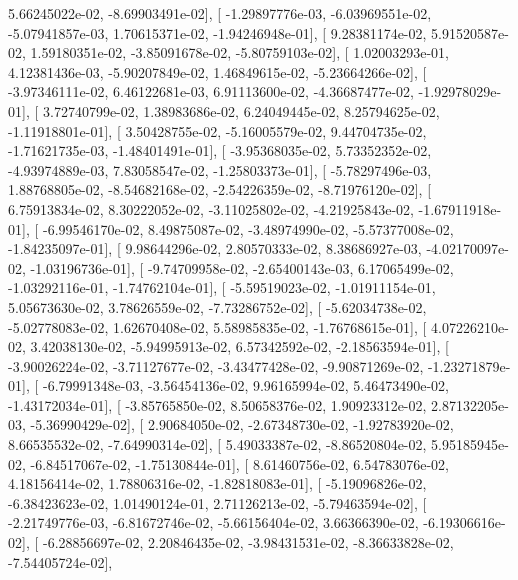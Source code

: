\documentclass{article}
\begin{document}
          5.66245022e-02,  -8.69903491e-02],
       [ -1.29897776e-03,  -6.03969551e-02,  -5.07941857e-03,
          1.70615371e-02,  -1.94246948e-01],
       [  9.28381174e-02,   5.91520587e-02,   1.59180351e-02,
         -3.85091678e-02,  -5.80759103e-02],
       [  1.02003293e-01,   4.12381436e-03,  -5.90207849e-02,
          1.46849615e-02,  -5.23664266e-02],
       [ -3.97346111e-02,   6.46122681e-03,   6.91113600e-02,
         -4.36687477e-02,  -1.92978029e-01],
       [  3.72740799e-02,   1.38983686e-02,   6.24049445e-02,
          8.25794625e-02,  -1.11918801e-01],
       [  3.50428755e-02,  -5.16005579e-02,   9.44704735e-02,
         -1.71621735e-03,  -1.48401491e-01],
       [ -3.95368035e-02,   5.73352352e-02,  -4.93974889e-03,
          7.83058547e-02,  -1.25803373e-01],
       [ -5.78297496e-03,   1.88768805e-02,  -8.54682168e-02,
         -2.54226359e-02,  -8.71976120e-02],
       [  6.75913834e-02,   8.30222052e-02,  -3.11025802e-02,
         -4.21925843e-02,  -1.67911918e-01],
       [ -6.99546170e-02,   8.49875087e-02,  -3.48974990e-02,
         -5.57377008e-02,  -1.84235097e-01],
       [  9.98644296e-02,   2.80570333e-02,   8.38686927e-03,
         -4.02170097e-02,  -1.03196736e-01],
       [ -9.74709958e-02,  -2.65400143e-03,   6.17065499e-02,
         -1.03292116e-01,  -1.74762104e-01],
       [ -5.59519023e-02,  -1.01911154e-01,   5.05673630e-02,
          3.78626559e-02,  -7.73286752e-02],
       [ -5.62034738e-02,  -5.02778083e-02,   1.62670408e-02,
          5.58985835e-02,  -1.76768615e-01],
       [  4.07226210e-02,   3.42038130e-02,  -5.94995913e-02,
          6.57342592e-02,  -2.18563594e-01],
       [ -3.90026224e-02,  -3.71127677e-02,  -3.43477428e-02,
         -9.90871269e-02,  -1.23271879e-01],
       [ -6.79991348e-03,  -3.56454136e-02,   9.96165994e-02,
          5.46473490e-02,  -1.43172034e-01],
       [ -3.85765850e-02,   8.50658376e-02,   1.90923312e-02,
          2.87132205e-03,  -5.36990429e-02],
       [  2.90684050e-02,  -2.67348730e-02,  -1.92783920e-02,
          8.66535532e-02,  -7.64990314e-02],
       [  5.49033387e-02,  -8.86520804e-02,   5.95185945e-02,
         -6.84517067e-02,  -1.75130844e-01],
       [  8.61460756e-02,   6.54783076e-02,   4.18156414e-02,
          1.78806316e-02,  -1.82818083e-01],
       [ -5.19096826e-02,  -6.38423623e-02,   1.01490124e-01,
          2.71126213e-02,  -5.79463594e-02],
       [ -2.21749776e-03,  -6.81672746e-02,  -5.66156404e-02,
          3.66366390e-02,  -6.19306616e-02],
       [ -6.28856697e-02,   2.20846435e-02,  -3.98431531e-02,
         -8.36633828e-02,  -7.54405724e-02],
\end{document}
